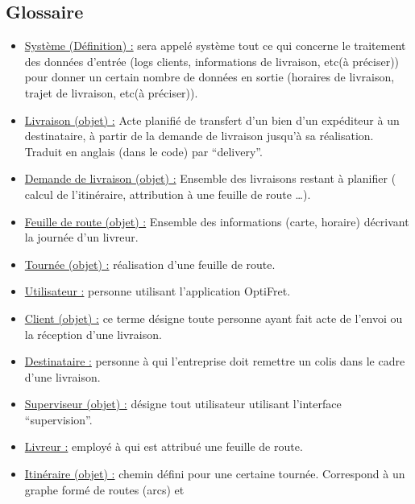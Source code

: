 \documentclass[a4paper]{report}
\begin{document}
\begin{appendices}
    \chapter{Glossaire}

    \begin{itemize}[label = \textbullet, font = \color{orange}]
        \item \underline{Système (Définition) :} sera appelé système tout ce
            qui concerne le traitement des données d’entrée (logs clients,
            informations de livraison, etc(à préciser)) pour donner un certain
            nombre de données en sortie (horaires de livraison, trajet de
            livraison, etc(à préciser)).
        \item \underline{Livraison (objet) :} Acte planifié de transfert d’un
            bien d’un expéditeur à un destinataire, à partir de la demande de
            livraison  jusqu’à sa réalisation. Traduit en anglais (dans le
            code) par “delivery”.
        \item \underline{Demande de livraison (objet) :} Ensemble des
            livraisons restant à planifier ( calcul de l’itinéraire,
            attribution à une feuille de route …). 
        \item \underline{Feuille de route (objet) :} Ensemble des informations
            (carte, horaire) décrivant la journée d’un livreur.
        \item \underline{Tournée (objet) :} réalisation d’une feuille de route.
        \item \underline{Utilisateur :} personne utilisant l’application
            OptiFret. 
        \item \underline{Client (objet) :}  ce terme désigne toute personne
            ayant fait acte de l’envoi ou la réception d’une livraison. 
        \item \underline{Destinataire :} personne à qui l’entreprise doit
            remettre un colis dans le cadre d’une livraison.
        \item \underline{Superviseur (objet) :} désigne tout utilisateur
            utilisant l’interface “supervision”.
        \item \underline{Livreur :} employé à qui est attribué une feuille de
            route.
        \item \underline{Itinéraire (objet) :} chemin défini pour une certaine
            tournée. Correspond à un graphe formé de routes (arcs) et

\end{itemize}
\end{appendices}
\end{document}
